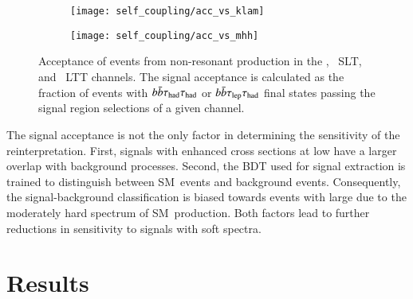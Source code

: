 \begin{figure}[htbp]
  \centering

  \begin{subfigure}[t]{0.485\textwidth}
    \texttt{[image: self\_coupling/acc\_vs\_klam]}
    \label{fig:acceptance_vs_klambda}
  \end{subfigure}\hfill%
  \begin{subfigure}[t]{0.485\textwidth}
    \texttt{[image: self\_coupling/acc\_vs\_mhh]}
    \label{fig:acceptance_vs_mhh}
  \end{subfigure}

  \caption{Acceptance of events from non-resonant \HH production in
    the \hadhad, \lephad~SLT, and \lephad~LTT channels. The signal
    acceptance is calculated as the fraction of events with
    $b\bar{b}\tau_{\text{had}}\tau_{\text{had}}$ or $b\bar{b}\tau_{\text{lep}}\tau_{\text{had}}$ final states
    passing the signal region selections of a given channel.}%
  \label{fig:acceptance_vs_klambda_vs_mhh}
\end{figure}

The signal acceptance is not the only factor in determining the sensitivity of
the reinterpretation. First, signals with enhanced cross sections at low \mHH
have a larger overlap with background processes.
Second, the BDT used for signal extraction is trained to distinguish between
SM~\HH events and background events. Consequently, the signal-background
classification is biased towards events with large \mHH due to the moderately
hard \mHH spectrum of SM~\HH production. Both factors lead to further reductions
in sensitivity to signals with soft \mHH spectra.



\section{Results}%
\label{sec:reinterpretation_results}


